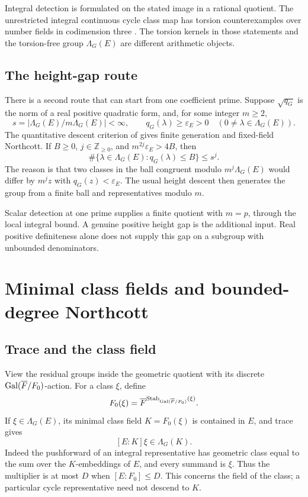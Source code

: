 \documentclass[11pt,a4paper]{article}
\theoremstyle{definition}
\newcommand{\Z}{\mathbb Z}\newcommand{\A}{\mathbb A}\newcommand{\Fbar}{\overline F}
\numberwithin{equation}{section}
\begin{document}
Integral detection is formulated on the stated image in
a rational quotient. The unrestricted integral continuous
cycle class map has torsion counterexamples over number
fields in codimension three
\cite[Theorems 1.3--1.4]{ScaviaSuzuki}.
The torsion kernels in those statements and the torsion-free
group \(\Lambda_G(E)\) are different arithmetic objects.

\subsection{The height-gap route}\label{sec:height-gap-route}

There is a second route that can start from one coefficient
prime. Suppose \(\sqrt{q_G}\) is the norm of a real positive
quadratic form, and, for some integer \(m\ge2\),
\[
 s=|\Lambda_G(E)/m\Lambda_G(E)|<\infty,\qquad
 q_G(\lambda)\ge\varepsilon_E>0
       \quad(0\ne\lambda\in\Lambda_G(E)).
\]
The quantitative descent criterion of
\cite[Section 5.4]{ArithmeticReductions} gives finite
generation and fixed-field Northcott. If \(B\ge0\),
\(j\in\Z_{\ge0}\), and \(m^{2j}\varepsilon_E>4B\), then
\[
 \#\{\lambda\in\Lambda_G(E):q_G(\lambda)\le B\}\le s^j.
\]
The reason is that two classes in the ball congruent
modulo \(m^j\Lambda_G(E)\) would differ by \(m^jz\) with
\(q_G(z)<\varepsilon_E\). The usual height descent then
generates the group from a finite ball and representatives
modulo \(m\).

Scalar detection at one prime supplies a finite quotient
with \(m=p\), through the local integral bound.
A genuine positive height gap is the additional input.
Real positive definiteness alone does not supply this gap
on a subgroup with unbounded denominators.

\section{Minimal class fields and bounded-degree Northcott}
\label{sec:class-fields}

\subsection{Trace and the class field}\label{sec:class-trace}

View the residual groups inside the geometric quotient
with its discrete \(\Gal(\Fbar/F_0)\)-action. For a class
\(\xi\), define
\[
 F_0(\xi)=
 \Fbar^{\operatorname{Stab}_{\Gal(\Fbar/F_0)}(\xi)}.
\]
If \(\xi\in\Lambda_G(E)\), its minimal class field
\(K=F_0(\xi)\) is contained in \(E\), and trace gives
\begin{equation}\label{eq:class-trace}
 [E:K]\xi\in\Lambda_G(K).
\end{equation}
Indeed the pushforward of an integral representative has
geometric class equal to the sum over the \(K\)-embeddings
of \(E\), and every summand is \(\xi\). Thus the multiplier
is at most \(D\) when \([E:F_0]\le D\).
This concerns the field of the class; a particular cycle
representative need not descend to \(K\).
\end{document}
